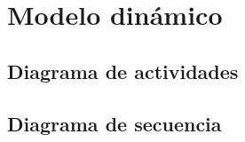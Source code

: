 \section{Modelo dinámico}
\subsection{Diagrama de actividades}
\subsection{Diagrama de secuencia}


